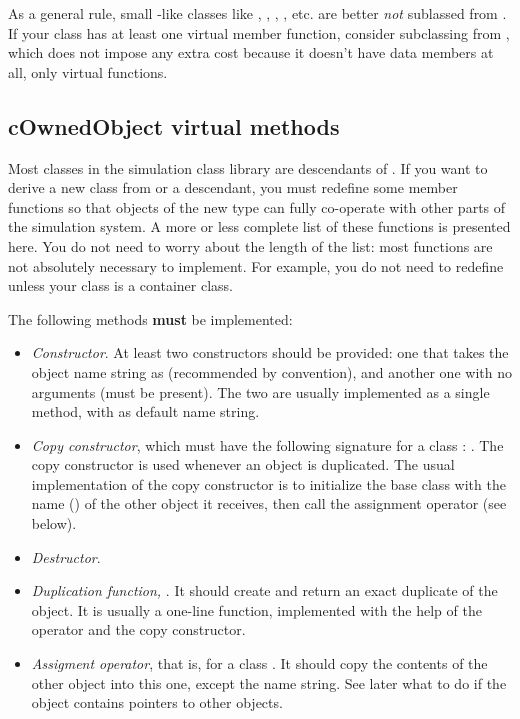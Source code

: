 As a general rule, small -like classes like ,
, , , etc.
are better \textit{not} sublassed from .
If your class has at least one virtual member function, consider
subclassing from , which does not impose any
extra cost because it doesn't have data members at all, only
virtual functions.


\subsection{cOwnedObject virtual methods}

Most classes in the simulation class library are descendants of
. If you want to derive a new class from
 or a  descendant, you must redefine
some member functions so that objects of the new type can fully
co-operate with other parts of the simulation system. A more or less
complete list of these functions is presented here. You do not need to
worry about the length of the list: most functions are not
absolutely necessary to implement. For example, you do not need to
redefine  unless your class is a container class.

The following methods \textbf{must} be implemented:

\begin{itemize}
  \item{\textit{Constructor}. At least two constructors should be provided:
        one that takes the object name string as 
        (recommended by convention), and another one with no arguments
        (must be present). The two are usually implemented as a single
        method, with  as default name string.}
  \item{\textit{Copy constructor}, which must have the following signature
        for a class : . The copy constructor is used
        whenever an object is duplicated. The usual implementation of
        the copy constructor is to initialize the base class with the
        name () of the other object it receives, then call the
        assignment operator (see below).}
  \item{\textit{Destructor}.}
  \item{\textit{Duplication function,} .
        It should create and return an exact duplicate of the object.
        It is usually a one-line function, implemented with the help
        of the  operator and the copy constructor.}
  \item{\textit{Assigment operator}, that is, 
        for a class . It should copy the contents of the other
        object into this one, except the name string. See later what to do
        if the object contains pointers to other objects.}
\end{itemize}

